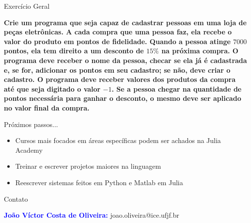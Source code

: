 \documentclass{beamer}
\begin{document}
\begin{frame}{Exercício Geral}
    \begin{center}
        \textbf{Crie um programa que seja capaz de cadastrar pessoas em uma loja de peças eletrônicas. A cada compra que uma pessoa faz, ela recebe o valor do produto em pontos de fidelidade. Quando a pessoa atinge $7000$ pontos, ela tem direito a um desconto de $15\%$ na próxima compra. O programa deve receber o nome da pessoa, checar se ela já é cadastrada e, se for, adicionar os pontos em seu cadastro; se não, deve criar o cadastro. O programa deve receber valores dos produtos da compra até que seja digitado o valor $-1$. Se a pessoa chegar na quantidade de pontos necessária para ganhar o desconto, o mesmo deve ser aplicado no valor final da compra.}
    \end{center}
\end{frame}

\begin{frame}{Próximos passos...}
    \begin{itemize}
        \item Cursos mais focados em áreas específicas podem ser achados na Julia Academy
        \item Treinar e escrever projetos maiores na linguagem
        \item Reescrever sistemas feitos em Python e Matlab em Julia
    \end{itemize}
\end{frame}

\begin{frame}{Contato}
    \begin{center}
        \textcolor{blue}{\textbf{João Víctor Costa de Oliveira:}} joao.oliveira@ice.ufjf.br\\
    \end{center}
\end{frame}
\end{document}
